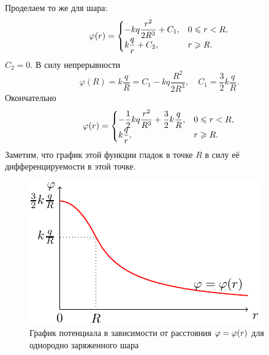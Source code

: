 	Проделаем то же для шара:
	\begin{equation}
		\varphi(r)=\begin{cases}
						-kq\dfrac{r^2}{2R^3}+C_1,& \text{$0\leqslant r<R$},\\
						k\dfrac{q}{r} + C_2,& \text{$r\geqslant R$}.
					\end{cases}
	\end{equation}
	$C_2=0$. В силу непрерывности
		$$\varphi(R)=k\frac{q}{R}=C_1-kq\frac{R^2}{2R^3}, \quad C_1=\frac{3}{2}k\frac{q}{R}.$$
	Окончательно
	\begin{equation}
		\varphi(r)=\begin{cases}
						-\dfrac{1}{2}kq\dfrac{r^2}{R^3}+\dfrac{3}{2}k\dfrac{q}{R},& \text{$0\leqslant r<R$},\\
						k\dfrac{q}{r},& \text{$r\geqslant R$}.
					\end{cases}
	\end{equation}
	Заметим, что график этой функции гладок в точке $R$ в силу её дифференцируемости в этой точке. 
	\begin{figure}[t]
		\centering
		\includegraphics[scale=2]{./img/plot4/plot4.pdf}
		\caption{График потенциала в зависимости от расстояния $\varphi\hm{=}\varphi(r)$ для однородно заряженного шара}
	\end{figure}